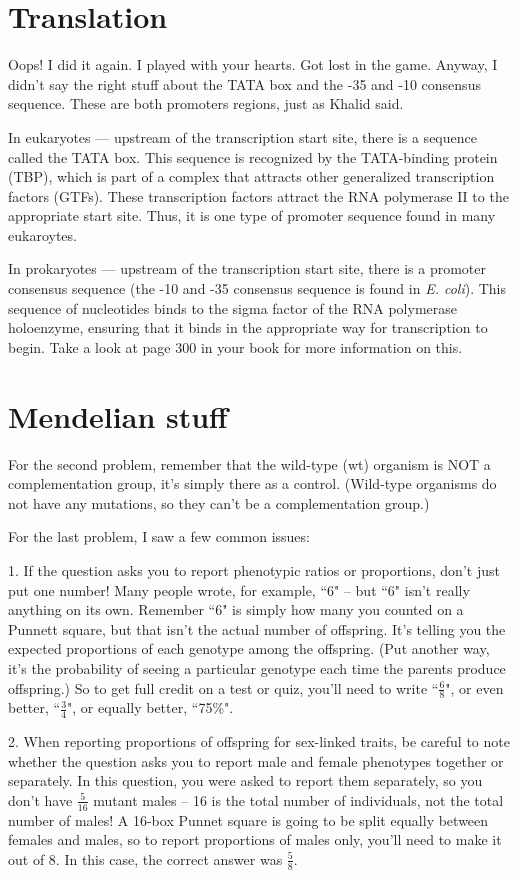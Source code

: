 \documentclass[11pt]{article}
\begin{document}
\section{Translation}
Oops! I did it again. I played with your hearts. Got lost in the game. Anyway, I didn't say the right stuff about the TATA box and the -35 and -10 consensus sequence. These are both promoters regions, just as Khalid said.

In eukaryotes --- upstream of the transcription start site, there is a sequence called the TATA box. This sequence is recognized by the TATA-binding protein (TBP), which is part of a complex that attracts other generalized transcription factors (GTFs). These transcription factors attract the RNA polymerase II to the appropriate start site. Thus, it is one type of promoter sequence found in many eukaroytes. 

In prokaryotes --- upstream of the transcription start site, there is a promoter consensus sequence (the -10 and -35 consensus sequence is found in \textit{E. coli}). This sequence of nucleotides binds to the sigma factor of the RNA polymerase holoenzyme, ensuring that it binds in the appropriate way for transcription to begin. Take a look at page 300 in your book for more information on this.


\section{Mendelian stuff}
For the second problem, remember that the wild-type (wt) organism is NOT a complementation group, it's simply there as a control. (Wild-type organisms do not have any mutations, so they can't be a complementation group.)

For the last problem, I saw a few common issues:

1. If the question asks you to report phenotypic ratios or proportions, don't just put one number! Many people wrote, for example, ``6" -- but ``6" isn't really anything on its own. Remember ``6" is simply how many you counted on a Punnett square, but that isn't the actual number of offspring. It's telling you the expected proportions of each genotype among the offspring. (Put another way, it's the probability of seeing a particular genotype each time the parents produce offspring.) So to get full credit on a test or quiz, you'll need to write ``$\frac{6}{8}$", or even better, ``$\frac{3}{4}$", or equally better, ``75\%".

2. When reporting proportions of offspring for sex-linked traits, be careful to note whether the question asks you to report male and female phenotypes together or separately. In this question, you were asked to report them separately, so you don't have $\frac{5}{16}$ mutant males -- 16 is the total number of individuals, not the total number of males! A 16-box Punnet square is going to be split equally between females and males, so to report proportions of males only, you'll need to make it out of 8. In this case, the correct answer was $\frac{5}{8}$.
\end{document}
